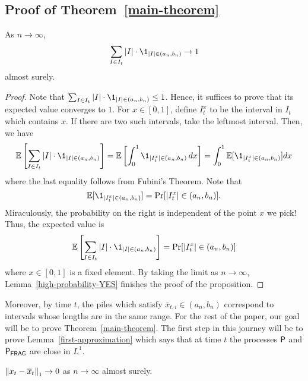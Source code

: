 \documentclass[12pt]{article}
\begin{document}
\subsection{Proof of Theorem~\ref{main-theorem}}

\begin{prop} \label{zero-approximation}
	As $n \to \infty$, 
	\[
		\sum_{I \in I_t} |I| \cdot \1_{|I| \in (a_n, b_n)} \to 1
	\]
	almost surely. 
\end{prop}

\begin{proof}
	Note that $\sum_{I \in I_t} |I| \cdot \1_{|I| \in (a_n, b_n)} \leq 1$. Hence, it suffices to prove that its expected value converges to $1$. For $x \in [0, 1]$, define $I_t^x$ to be the interval in $I_t$ which contains $x$. If there are two such intervals, take the leftmost interval. Then, we have
	\[
		\EE \left [ \sum_{I \in I_t} |I| \cdot \1_{|I| \in (a_n, b_n)} \right ] = \EE \left [ \int_0^1 \1_{|I_t^x| \in (a_n, b_n)} \, dx \right ] = \int_0^1 \EE[\1_{|I_t^x| \in (a_n, b_n)} ] dx
	\]
	where the last equality follows from Fubini's Theorem. Note that 
	\[
		\EE[\1_{|I_t^x| \in (a_n, b_n)}] = \Pr[|I_t^x| \in (a_n, b_n)].
	\]
	Miraculously, the probability on the right is independent of the point $x$ we pick! Thus, the expected value is
	\[ 
		\EE \left [ \sum_{I \in I_t} |I| \cdot \1_{|I| \in (a_n, b_n)} \right ] = \Pr[|I_t^x| \in (a_n, b_n)]
	\]
	where $x \in [0, 1]$ is a fixed element. By taking the limit as $n \to \infty$, Lemma~\ref{high-probability-YES} finishes the proof of the proposition. 
\end{proof}

Moreover, by time $t$, the piles which satisfy $\overline{x}_{t, i} \in (a_n, b_n)$ correspond to intervals whose lengths are in the same range. For the rest of the paper, our goal will be to prove Theorem~\ref{main-theorem}. The first step in this journey will be to prove Lemma~\ref{first-approximation} which says that at time $t$ the processes $\mathsf{P}$ and $\mathsf{P}_{\mathsf{FRAG}}$ are close in $L^1$. 
\begin{lem} \label{first-approximation}
	$\left\lVert x_t - \overline{x}_t \right\rVert_1 \to 0$ as $n \to \infty$ almost surely. 
\end{lem}
\end{document}
